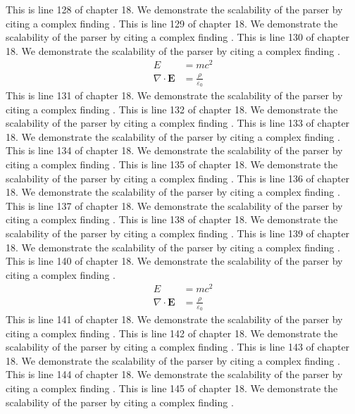This is line 128 of chapter 18. We demonstrate the scalability of the parser by citing a complex finding \cite{ref18_128}.
This is line 129 of chapter 18. We demonstrate the scalability of the parser by citing a complex finding \cite{ref18_129}.
This is line 130 of chapter 18. We demonstrate the scalability of the parser by citing a complex finding \cite{ref18_130}.
\begin{align*}
  E &= mc^2 \\
  \nabla \cdot \mathbf{E} &= \frac{\rho}{\varepsilon_0}
\end{align*}
This is line 131 of chapter 18. We demonstrate the scalability of the parser by citing a complex finding \cite{ref18_131}.
This is line 132 of chapter 18. We demonstrate the scalability of the parser by citing a complex finding \cite{ref18_132}.
This is line 133 of chapter 18. We demonstrate the scalability of the parser by citing a complex finding \cite{ref18_133}.
This is line 134 of chapter 18. We demonstrate the scalability of the parser by citing a complex finding \cite{ref18_134}.
This is line 135 of chapter 18. We demonstrate the scalability of the parser by citing a complex finding \cite{ref18_135}.
This is line 136 of chapter 18. We demonstrate the scalability of the parser by citing a complex finding \cite{ref18_136}.
This is line 137 of chapter 18. We demonstrate the scalability of the parser by citing a complex finding \cite{ref18_137}.
This is line 138 of chapter 18. We demonstrate the scalability of the parser by citing a complex finding \cite{ref18_138}.
This is line 139 of chapter 18. We demonstrate the scalability of the parser by citing a complex finding \cite{ref18_139}.
This is line 140 of chapter 18. We demonstrate the scalability of the parser by citing a complex finding \cite{ref18_140}.
\begin{align*}
  E &= mc^2 \\
  \nabla \cdot \mathbf{E} &= \frac{\rho}{\varepsilon_0}
\end{align*}
This is line 141 of chapter 18. We demonstrate the scalability of the parser by citing a complex finding \cite{ref18_141}.
This is line 142 of chapter 18. We demonstrate the scalability of the parser by citing a complex finding \cite{ref18_142}.
This is line 143 of chapter 18. We demonstrate the scalability of the parser by citing a complex finding \cite{ref18_143}.
This is line 144 of chapter 18. We demonstrate the scalability of the parser by citing a complex finding \cite{ref18_144}.
This is line 145 of chapter 18. We demonstrate the scalability of the parser by citing a complex finding \cite{ref18_145}.
